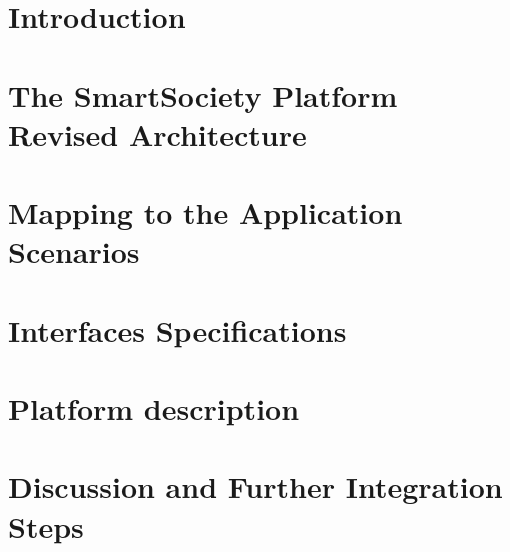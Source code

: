 \documentclass{SmartReport}
\begin{document}
\newpage


\section{Introduction}
\label{sec:intro}
%

\newpage


\section{The SmartSociety Platform Revised Architecture}
\label{sec:arch}

\newpage

\section{Mapping to the Application Scenarios}
\label{sec:mapping}

\newpage

\section{Interfaces Specifications}
\label{sec:apis}

\newpage


\section{Platform description}
\label{sec:sw}
%
\newpage

\section{Discussion and Further Integration Steps}
\label{sec:concl}

\newpage



%
\end{document}
